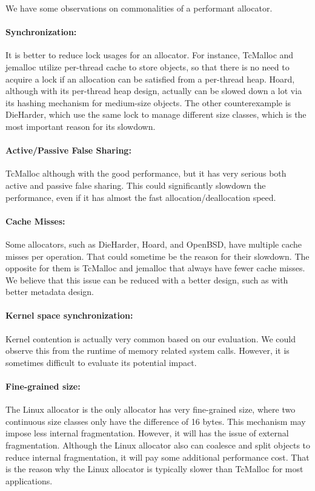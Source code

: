 We have some observations on commonalities of a performant allocator. 

\paragraph{Synchronization:} It is better to reduce lock usages for an allocator. For instance, TcMalloc and jemalloc utilize per-thread cache to store objects, so that there is no need to acquire a lock if an allocation can be satisfied from a per-thread heap. Hoard, although with its per-thread heap design, actually can be slowed down a lot via its hashing mechanism for medium-size objects. The other counterexample is DieHarder, which use the same lock to manage different size classes, which is the most important reason for its slowdown. 

\paragraph{Active/Passive False Sharing:} TcMalloc although with the good performance, but it has very serious both active and passive false sharing. This could significantly slowdown the performance, even if it has almost the fast allocation/deallocation speed.  

\paragraph{Cache Misses:} Some allocators, such as DieHarder, Hoard, and  OpenBSD, have multiple cache misses per operation. That could sometime be the reason for their slowdown. The opposite for them is TcMalloc and jemalloc that always have fewer cache misses. We believe that this issue can be reduced with a better design, such as with better metadata design.  

\paragraph{Kernel space synchronization:} Kernel contention is actually very common based on our evaluation. We could observe this from the runtime of memory related system calls.  However, it is sometimes difficult to evaluate its potential impact.

\paragraph{Fine-grained size:} The Linux allocator is the only allocator has very fine-grained size, where two continuous size classes only have the difference of 16 bytes. This mechanism may impose less internal fragmentation. However, it will has the issue of external fragmentation. Although the Linux allocator also can coalesce and split objects to reduce internal fragmentation, it will pay some additional performance cost. That is the reason why the Linux allocator is typically slower than TcMalloc for most applications.

